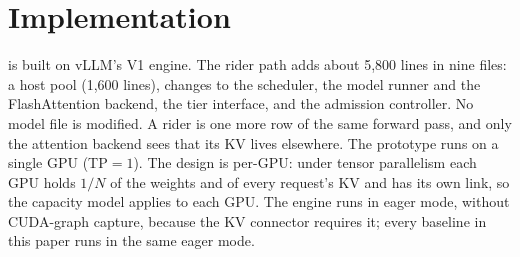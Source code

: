 
\section{Implementation}\label{sec:impl}

\sysname{} is built on vLLM's V1 engine. The rider path adds about 5{,}800
lines in nine files: a host pool (1{,}600 lines), changes to the scheduler, the
model runner and the FlashAttention backend, the tier interface, and the
admission controller. No model file is modified. A rider is one more row of
the same forward pass, and only the attention backend sees that its KV lives
elsewhere. The prototype runs on a single GPU (TP${=}1$). The design is
per-GPU: under tensor parallelism each GPU holds $1/N$ of the weights and of
every request's KV and has its own link, so the capacity model applies to
each GPU. The engine runs in eager mode, without CUDA-graph capture, because
the KV connector requires it; every baseline in this paper runs in the same
eager mode.


